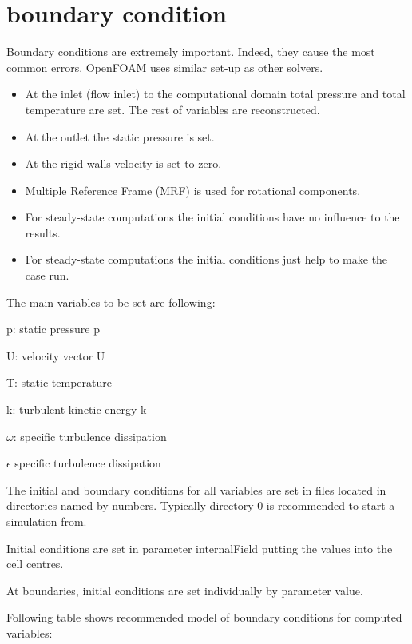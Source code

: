 \documentclass{article}
\begin{document}
\section{boundary condition}

Boundary conditions are extremely important. Indeed, they cause the most common errors.
OpenFOAM uses similar set-up as other solvers.
\begin{itemize}
    \item At the inlet (flow inlet) to the computational domain total pressure and total temperature are set. The rest of variables are reconstructed.
    \item At the outlet the static pressure is set.
    \item At the rigid walls velocity is set to zero.
    \item Multiple Reference Frame (MRF) is used for rotational components.
    \item For steady-state computations the initial conditions have no influence to the results.
    \item For steady-state computations the initial conditions just help to make the case run.
\end{itemize}

The main variables to be set are following:

p: static pressure p

U: velocity vector U

T: static temperature

k: turbulent kinetic energy k

$\omega$: specific turbulence dissipation 

$\epsilon$ specific turbulence dissipation

The initial and boundary conditions for all variables are set in files located in directories named by numbers. Typically directory 0 is recommended to start a simulation from. 

Initial conditions are set in parameter internalField putting the values into the cell centres. 

At boundaries, initial conditions are set individually by parameter value.

Following table shows recommended model of boundary conditions for computed variables:
\end{document}
